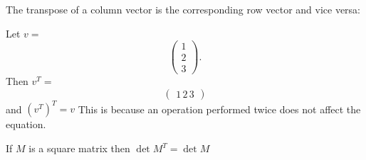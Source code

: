 \begin{definition}[Transpose]
    The transpose of a column vector is the corresponding row vector and vice versa:
\end{definition}
\begin{exmp}
  Let $v=$ \[ \begin{pmatrix}
        1 \\
        2  \\
        3
  \end{pmatrix}.\]
  Then
  $v^T =$
  \[
  \begin{pmatrix}
    1 \, 2 \, 3
  \end{pmatrix}\]
  and $(v^T)^T = v$  This is because an operation performed twice does not affect the equation. 
\end{exmp}
\begin{proposition}
  If $M$ is a square matrix then $\det M^T = \det M$
\end{proposition}
